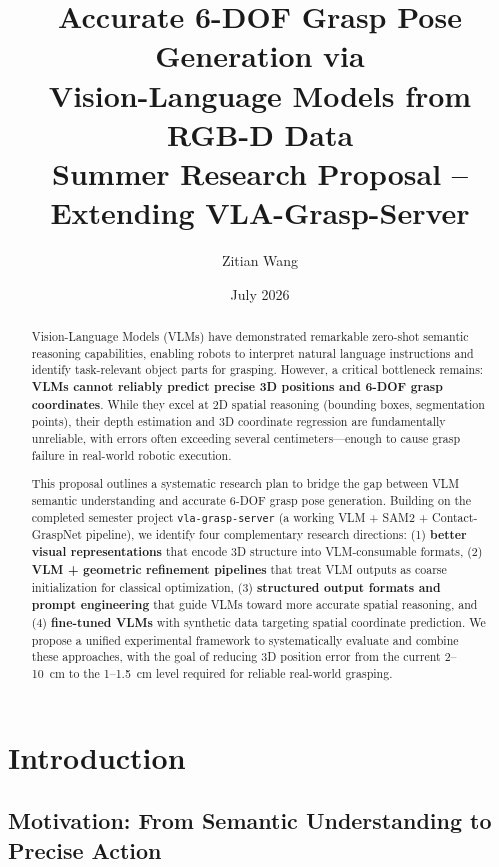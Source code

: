 \documentclass[11pt,a4paper]{article}
\title{\textbf{Accurate 6-DOF Grasp Pose Generation via\\Vision-Language Models from RGB-D Data}\\[0.5em]
       \large Summer Research Proposal -- Extending VLA-Grasp-Server}
\author{Zitian Wang\\}
\date{July 2026}
\begin{document}
\maketitle

\begin{abstract}
Vision-Language Models (VLMs) have demonstrated remarkable zero-shot semantic reasoning capabilities, enabling robots to interpret natural language instructions and identify task-relevant object parts for grasping. However, a critical bottleneck remains: \textbf{VLMs cannot reliably predict precise 3D positions and 6-DOF grasp coordinates}. While they excel at 2D spatial reasoning (bounding boxes, segmentation points), their depth estimation and 3D coordinate regression are fundamentally unreliable, with errors often exceeding several centimeters---enough to cause grasp failure in real-world robotic execution.

This proposal outlines a systematic research plan to bridge the gap between VLM semantic understanding and accurate 6-DOF grasp pose generation. Building on the completed semester project \texttt{vla-grasp-server} (a working VLM + SAM2 + Contact-GraspNet pipeline), we identify four complementary research directions: (1) \textbf{better visual representations} that encode 3D structure into VLM-consumable formats, (2) \textbf{VLM + geometric refinement pipelines} that treat VLM outputs as coarse initialization for classical optimization, (3) \textbf{structured output formats and prompt engineering} that guide VLMs toward more accurate spatial reasoning, and (4) \textbf{fine-tuned VLMs} with synthetic data targeting spatial coordinate prediction. We propose a unified experimental framework to systematically evaluate and combine these approaches, with the goal of reducing 3D position error from the current 2--10~cm to the 1--1.5~cm level required for reliable real-world grasping.
\end{abstract}

\section{Introduction}

\subsection{Motivation: From Semantic Understanding to Precise Action}
\end{document}
